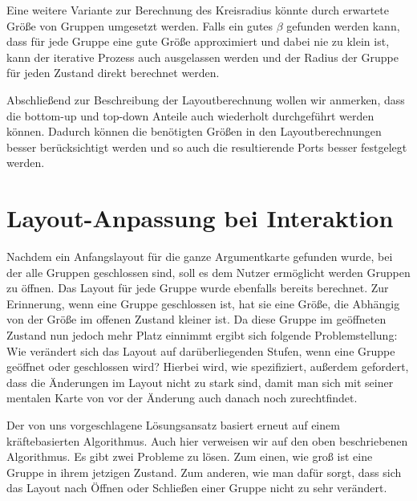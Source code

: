 Eine weitere Variante zur Berechnung des Kreisradius könnte durch erwartete Größe von Gruppen umgesetzt werden. 
Falls ein gutes $\beta$ gefunden werden kann, dass für jede Gruppe eine gute Größe approximiert und dabei nie zu klein ist, kann der iterative Prozess auch ausgelassen werden
und der Radius der Gruppe für jeden Zustand direkt berechnet werden.			


Abschließend zur Beschreibung der Layoutberechnung wollen wir anmerken, dass die bottom-up und top-down Anteile auch wiederholt durchgeführt werden können.
Dadurch können die benötigten Größen in den Layoutberechnungen besser berücksichtigt werden und so auch die resultierende Ports besser festgelegt werden.

\section{Layout-Anpassung bei Interaktion}%
\label{sec:Interaktion}
Nachdem ein Anfangslayout für die ganze Argumentkarte gefunden wurde, bei der alle Gruppen geschlossen sind, soll es dem Nutzer ermöglicht werden Gruppen zu öffnen. 
Das Layout für jede Gruppe wurde ebenfalls bereits berechnet. Zur Erinnerung, wenn eine Gruppe geschlossen ist, hat sie eine Größe, 
die Abhängig von der Größe im offenen Zustand kleiner ist. 
Da diese Gruppe im geöffneten Zustand nun jedoch mehr Platz einnimmt ergibt sich folgende Problemstellung:
Wie verändert sich das Layout auf darüberliegenden Stufen, wenn eine Gruppe geöffnet oder geschlossen wird? 
Hierbei wird, wie spezifiziert, außerdem gefordert, dass die Änderungen im Layout nicht zu stark sind, 
damit man sich mit seiner mentalen Karte von vor der Änderung auch danach noch zurechtfindet.

Der von uns vorgeschlagene Lösungsansatz basiert erneut auf einem kräftebasierten Algorithmus. 
Auch hier verweisen wir auf den oben beschriebenen Algorithmus. Es gibt zwei Probleme zu lösen. 
Zum einen, wie groß ist eine Gruppe in ihrem jetzigen Zustand.  
Zum anderen, wie man dafür sorgt, dass sich das Layout nach Öffnen oder Schließen einer Gruppe nicht zu sehr verändert.

